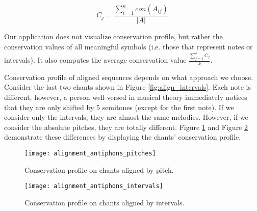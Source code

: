 \[
    C_j = \frac{\sum^n_{i=1}con(A_{ij})}{|A|}
\]

Our application does not visualize conservation profile, but rather the conservation values of all meaningful symbols (i.e. those that represent notes or intervals). It
also computes the average conservation value $\frac{\sum^k_{j=1} C_j}{k}$.

Conservation profile of aligned sequences depends on what approach we choo\-se. Consider the last two chants shown in Figure \ref{fig:align_intervals}. Each note
is different, however, a person well-versed in musical theory immediately notices that they are only shifted by 5 semitones (except for the first note). If we consider only
the intervals, they are almost the same melodies. However, if we consider the absolute pitches, they are totally different. Figure \ref{fig:cons_pitch}
and Figure \ref{fig:cons_intervals} demonstrate these differences by displaying the chants' conservation profile.

\begin{figure}[h]
\centering
\texttt{[image: alignment\_antiphons\_pitches]}
\caption{Conservation profile on chants aligned by pitch.}
\label{fig:cons_pitch}
\end{figure}

\begin{figure}[h]
\centering
\texttt{[image: alignment\_antiphons\_intervals]}
\caption{Conservation profile on chants aligned by intervals.}
\label{fig:cons_intervals}
\end{figure}
